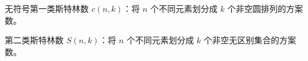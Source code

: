 无符号第一类斯特林数 $c(n,k)$：将 $n$ 个不同元素划分成 $k$ 个非空圆排列的方案数。

第二类斯特林数 $S(n,k)$：将 $n$ 个不同元素划分成 $k$ 个非空无区别集合的方案数。